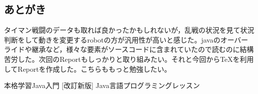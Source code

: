 \documentclass[12pt]{jarticle} %
\begin{document}
\begin{flushleft}
\newpage

\section{あとがき}
\item タイマン戦闘のデータも取れば良かったかもしれないが，乱戦の状況を見て状況判断をして動きを変更するrobotの方が汎用性が高いと感じた。javaのオーバーライドや継承など，様々な要素がソースコードに含まれていたので読むのに結構苦労した。次回のReportもしっかりと取り組みたい。それと今回からTeXを利用してReportを作成した。こちらももっと勉強したい。


\end{flushleft}



\begin{thebibliography}{9} 
	\bibitem{}本格学習Java入門 [改訂新版]
		\bibitem{}Java言語プログラミングレッスン
\end{thebibliography}
\end{document}
